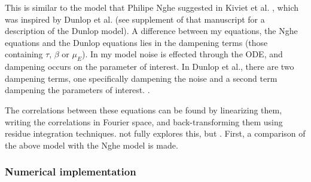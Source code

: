 This is similar to the model that Philipe Nghe suggested in Kiviet et al. \cite{Kiviet2014}, which was inspired by Dunlop et al. \cite{Dunlop2008} (see supplement of that manuscript for a description of the Dunlop model).
%
A difference between my equations, the Nghe equations and the Dunlop equations lies in the dampening terms (those containing $\tau$, $\beta$ or $\mu_E$). In my model noise is effected through the ODE, and dampening occurs on the parameter of interest. In Dunlop et al., there are two dampening terms, one specifically dampening the noise and a second term dampening the parameters of interest. .

The correlations between these equations can be found by linearizing them, writing the correlations in Fourier space, and back-transforming them using residue integration techniques. 
 not fully explores this, but .
First, a comparison of the above model with the Nghe model is made.

\subsubsection*{Numerical implementation}

